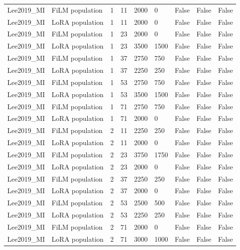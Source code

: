 \begin{longtable}{lllllllll}
Lee2019\_\allowbreak{}MI & FiLM population & 1 & 11 & 2000 & 0 & False & False & False \\
Lee2019\_\allowbreak{}MI & LoRA population & 1 & 11 & 2000 & 0 & False & False & False \\
Lee2019\_\allowbreak{}MI & FiLM population & 1 & 23 & 2000 & 0 & False & False & False \\
Lee2019\_\allowbreak{}MI & LoRA population & 1 & 23 & 3500 & 1500 & False & False & False \\
Lee2019\_\allowbreak{}MI & FiLM population & 1 & 37 & 2750 & 750 & False & False & False \\
Lee2019\_\allowbreak{}MI & LoRA population & 1 & 37 & 2250 & 250 & False & False & False \\
Lee2019\_\allowbreak{}MI & FiLM population & 1 & 53 & 2750 & 750 & False & False & False \\
Lee2019\_\allowbreak{}MI & LoRA population & 1 & 53 & 3500 & 1500 & False & False & False \\
Lee2019\_\allowbreak{}MI & FiLM population & 1 & 71 & 2750 & 750 & False & False & False \\
Lee2019\_\allowbreak{}MI & LoRA population & 1 & 71 & 2000 & 0 & False & False & False \\
Lee2019\_\allowbreak{}MI & FiLM population & 2 & 11 & 2250 & 250 & False & False & False \\
Lee2019\_\allowbreak{}MI & LoRA population & 2 & 11 & 2000 & 0 & False & False & False \\
Lee2019\_\allowbreak{}MI & FiLM population & 2 & 23 & 3750 & 1750 & False & False & False \\
Lee2019\_\allowbreak{}MI & LoRA population & 2 & 23 & 2000 & 0 & False & False & False \\
Lee2019\_\allowbreak{}MI & FiLM population & 2 & 37 & 2250 & 250 & False & False & False \\
Lee2019\_\allowbreak{}MI & LoRA population & 2 & 37 & 2000 & 0 & False & False & False \\
Lee2019\_\allowbreak{}MI & FiLM population & 2 & 53 & 2500 & 500 & False & False & False \\
Lee2019\_\allowbreak{}MI & LoRA population & 2 & 53 & 2250 & 250 & False & False & False \\
Lee2019\_\allowbreak{}MI & FiLM population & 2 & 71 & 2000 & 0 & False & False & False \\
Lee2019\_\allowbreak{}MI & LoRA population & 2 & 71 & 3000 & 1000 & False & False & False \\

\end{longtable}
